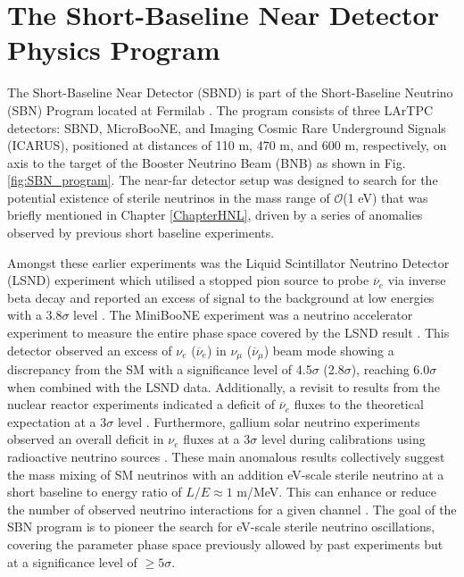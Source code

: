 \newpage
\section{The Short-Baseline Near Detector Physics Program}
\label{sec4PhysicsProgram}

The Short-Baseline Near Detector (SBND) is part of the Short-Baseline Neutrino (SBN) Program located at Fermilab \cite{SBNProgram}. 
The program consists of three LArTPC detectors: SBND, MicroBooNE, and Imaging Cosmic Rare Underground Signals (ICARUS), positioned at distances of 110 m, 470 m, and 600 m, respectively, on axis to the target of the Booster Neutrino Beam (BNB) as shown in Fig. \ref{fig:SBN_program}.
The near-far detector setup was designed to search for the potential existence of sterile neutrinos in the mass range of $\mathcal{O}$(1 eV) that was briefly mentioned in Chapter \ref{ChapterHNL}, driven by a series of anomalies observed by previous short baseline experiments.

Amongst these earlier experiments was the Liquid Scintillator Neutrino Detector (LSND) experiment which utilised a stopped pion source to probe $\overline{\nu}_{e}$ via inverse beta decay and reported an excess of signal to the background at low energies with a 3.8$\sigma$ level \cite{LSND_anomaly}. 
The MiniBooNE experiment was a neutrino accelerator experiment to measure the entire phase space covered by the LSND result \cite{Miniboone_anomaly}.
This detector observed an excess of $\nu_{e}$ ($\overline{\nu}_{e}$) in $\nu_{\mu}$ ($\overline{\nu}_{\mu}$) beam mode showing a discrepancy from the SM with a significance level of 4.5$\sigma$ (2.8$\sigma$), reaching 6.0$\sigma$ when combined with the LSND data.
Additionally, a revisit to results from the nuclear reactor experiments indicated a deficit of $\overline{\nu}_{e}$ fluxes to the theoretical expectation at a 3$\sigma$ level \cite{reactor_anomaly_1, reactor_anomaly_2}. 
Furthermore, gallium solar neutrino experiments observed an overall deficit in $\nu_{e}$ fluxes at a 3$\sigma$ level during calibrations using radioactive neutrino sources \cite{galium_anomaly_1, galium_anomaly_2}.
These main anomalous results collectively suggest the mass mixing of SM neutrinos with an addition eV-scale sterile neutrino at a short baseline to energy ratio of $L/E \approx 1 $ m/MeV.
This can enhance or reduce the number of observed neutrino interactions for a given channel \cite{SBNProgram}.
The goal of the SBN program is to pioneer the search for eV-scale sterile neutrino oscillations, covering the parameter phase space previously allowed by past experiments but at a significance level of $\geq 5 \sigma$.

